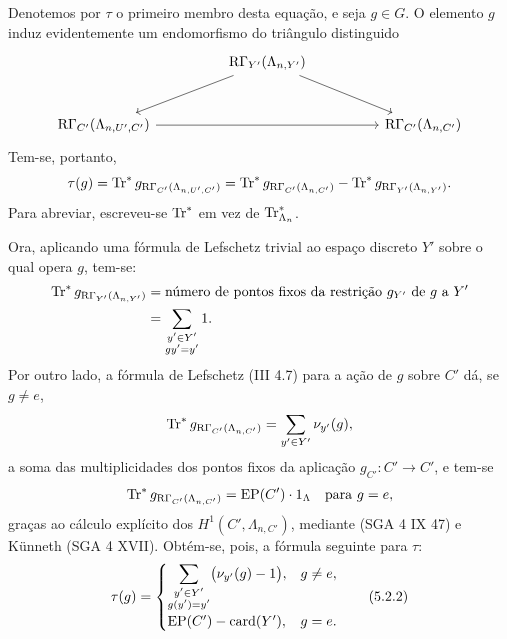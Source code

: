 Denotemos por $\tau$ o primeiro membro desta equação, e seja $g\in G$. O elemento $g$ induz evidentemente um endomorfismo do triângulo distinguido
\[
\begin{tikzcd}[column sep=huge,row sep=large]
& \RG_{Y'}(\Lambda_{n,Y'}) \arrow[dl] \arrow[dr] & \\
\RG_{C'}(\Lambda_{n,U',C'}) \arrow[rr] && \RG_{C'}(\Lambda_{n,C'})
\end{tikzcd}
\]
Tem-se, portanto,
\[
\tau(g)=\operatorname{Tr}^*g_{\mathrm{R}\Gamma_{C'}(\Lambda_{n,U',C'})}
=\operatorname{Tr}^*g_{\mathrm{R}\Gamma_{C'}(\Lambda_{n,C'})}
-\operatorname{Tr}^*g_{\mathrm{R}\Gamma_{Y'}(\Lambda_{n,Y'})}.
\]
Para abreviar, escreveu-se $\operatorname{Tr}^*$ em vez de $\operatorname{Tr}^*_{\Lambda_n}$.

Ora, aplicando uma fórmula de Lefschetz trivial ao espaço discreto $Y'$ sobre o qual opera $g$, tem-se:
\[
\begin{aligned}
\operatorname{Tr}^*g_{\mathrm{R}\Gamma_{Y'}(\Lambda_{n,Y'})}
&=\text{número de pontos fixos da restrição } g_{Y'} \text{ de } g \text{ a } Y'\\
&=\sum_{\substack{y'\in Y'\\gy'=y'}}1.
\end{aligned}
\]
Por outro lado, a fórmula de Lefschetz (III 4.7) para a ação de $g$ sobre $C'$ dá, se $g\ne e$,
\[
\operatorname{Tr}^*g_{\mathrm{R}\Gamma_{C'}(\Lambda_{n,C'})}
=
\sum_{y'\in Y'} \nu_{y'}(g),
\]
a soma das multiplicidades dos pontos fixos da aplicação $g_{C'}:C'\to C'$, e tem-se
\[
\operatorname{Tr}^*g_{\mathrm{R}\Gamma_{C'}(\Lambda_{n,C'})}=\operatorname{EP}(C')\cdot1_\Lambda
\quad\text{para }g=e,
\]
graças ao cálculo explícito dos $H^1(C',\Lambda_{n,C'})$, mediante (SGA 4 IX 47) e Künneth (SGA 4 XVII). Obtém-se, pois, a fórmula seguinte para $\tau$:
\[
\tau(g)=
\begin{cases}
\displaystyle\sum_{\substack{y'\in Y'\\g(y')=y'}}\bigl(\nu_{y'}(g)-1\bigr),& g\ne e,\\[0.8em]
\operatorname{EP}(C')-\operatorname{card}(Y'),& g=e.
\end{cases}
\tag{5.2.2}
\]

